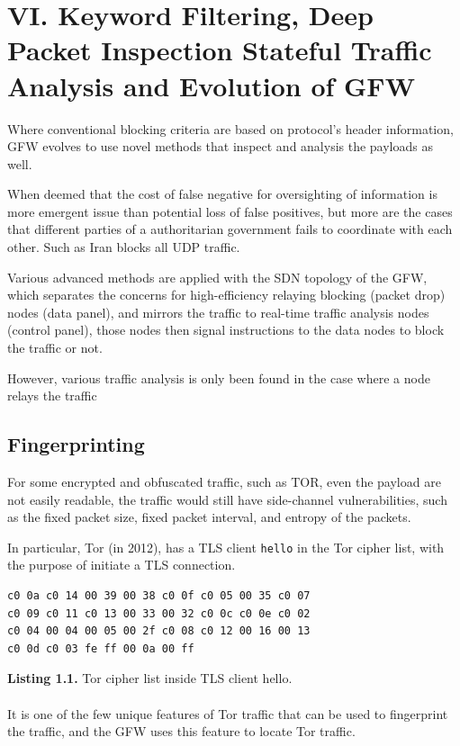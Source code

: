 \documentclass[nonacm,sigplan,screen]{acmart}
\begin{document}
\hypertarget{vi.-keyword-filtering-deep-packet-inspection-stateful-traffic-analysis-and-evolution-of-gfw}{%
\section{VI. Keyword Filtering, Deep Packet Inspection Stateful
Traffic Analysis and Evolution of
GFW}\label{vi.-keyword-filtering-deep-packet-inspection-stateful-traffic-analysis-and-evolution-of-gfw}}

Where conventional blocking criteria are based on protocol's header
information, GFW evolves to use novel methods that inspect and analysis
the payloads as well.

When deemed that the cost of false negative for oversighting of
information is more emergent issue than potential loss of false
positives, but more are the cases that different parties of a
authoritarian government fails to coordinate with each other. Such as
Iran blocks all UDP traffic. \cite{53_quicCensor}

Various advanced methods are applied with the SDN topology of the GFW,
which separates the concerns for high-efficiency relaying blocking
(packet drop) nodes (data panel), and mirrors the traffic to real-time
traffic analysis nodes (control panel), those nodes then signal
instructions to the data nodes to block the traffic or not.

However, various traffic analysis is only been found in the case where a
node relays the traffic

\hypertarget{fingerprinting}{%
\subsection{Fingerprinting}\label{fingerprinting}}

For some encrypted and obfuscated traffic, such as TOR, even the payload
are not easily readable, the traffic would still have side-channel
vulnerabilities, such as the fixed packet size, fixed packet interval,
and entropy of the packets. \cite{50_tor_finger} \cite{56_gfwTOR}
\cite{57_blockingTor}

In particular, Tor (in 2012), has a TLS client \texttt{hello} in the Tor
cipher list, with the purpose of initiate a TLS connection.\\
\hline
\begin{verbatim}
c0 0a c0 14 00 39 00 38 c0 0f c0 05 00 35 c0 07
c0 09 c0 11 c0 13 00 33 00 32 c0 0c c0 0e c0 02
c0 04 00 04 00 05 00 2f c0 08 c0 12 00 16 00 13
c0 0d c0 03 fe ff 00 0a 00 ff
\end{verbatim}\textbf{Listing 1.1.} Tor cipher list inside TLS client hello.
\\
\\
It is one of the few unique features of Tor traffic that can be used to
fingerprint the traffic, and the GFW uses this feature to locate Tor
traffic.
\end{document}
